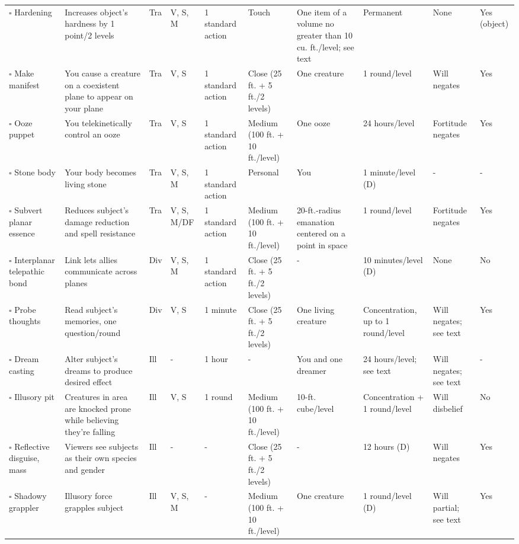 \documentclass[12pt, a4paper]{article}
\begin{document}
\begin{center}
\begin{longtable}[H]{ p{8em} p{15em} p{2em} p{5em} p{6em} p{6em} p{10em} p{6em} p{5em} p{2em} }
    \(\square\) Hardening & Increases object’s hardness by 1 point/2 levels & Tra & V, S, M & 1 standard action & Touch & One item of a volume no greater than 10 cu. ft./level; see text & Permanent & None & Yes (object)\\
    \(\square\) Make manifest & You cause a creature on a coexistent plane to appear on your plane & Tra & V, S & 1 standard action & Close (25 ft. + 5 ft./2 levels) & One creature & 1 round/level & Will negates & Yes\\
    \(\square\) Ooze puppet & You telekinetically control an ooze & Tra & V, S & 1 standard action & Medium (100 ft. + 10 ft./level) & One ooze & 24 hours/level & Fortitude negates & Yes\\
    \(\square\) Stone body & Your body becomes living stone & Tra & V, S, M & 1 standard action & Personal & You & 1 minute/level (D) & - & -\\
    \(\square\) Subvert planar essence & Reduces subject’s damage reduction and spell resistance & Tra & V, S, M/DF & 1 standard action & Medium (100 ft. + 10 ft./level) & 20-ft.-radius emanation centered on a point in space & 1 round/level & Fortitude negates & Yes\\
    \(\square\) Interplanar telepathic bond & Link lets allies communicate across planes & Div & V, S, M & 1 standard action & Close (25 ft. + 5 ft./2 levels) & - & 10 minutes/level (D) & None & No\\
    \(\square\) Probe thoughts & Read subject’s memories, one question/round & Div & V, S & 1 minute & Close (25 ft. + 5 ft./2 levels) & One living creature & Concentration, up to 1 round/level & Will negates; see text & Yes\\
    \(\square\) Dream casting & Alter subject’s dreams to produce desired effect & Ill & - & 1 hour & - & You and one dreamer & 24 hours/level; see text & Will negates; see text & -\\
    \(\square\) Illusory pit & Creatures in area are knocked prone while believing they’re falling & Ill & V, S & 1 round & Medium (100 ft. + 10 ft./level) & 10-ft. cube/level & Concentration + 1 round/level & Will disbelief & No\\
    \(\square\) Reflective disguise, mass & Viewers see subjects as their own species and gender & Ill & - & - & Close (25 ft. + 5 ft./2 levels) & - & 12 hours (D) & Will negates & Yes\\
    \(\square\) Shadowy grappler & Illusory force grapples subject & Ill & V, S, M & - & Medium (100 ft. + 10 ft./level) & One creature & 1 round/level (D) & Will partial; see text & Yes\\

\end{longtable}
\end{center}
\end{document}
